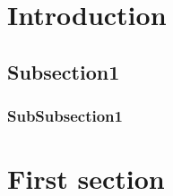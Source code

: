 \documentclass{centralelille}
\begin{document}
\maketitle

\blindtext

\section{Introduction}
\subsection{Subsection1}
\subsubsection{SubSubsection1}
\blindtext

\newpage
\section{First section}
\blindtext

\end{document}
